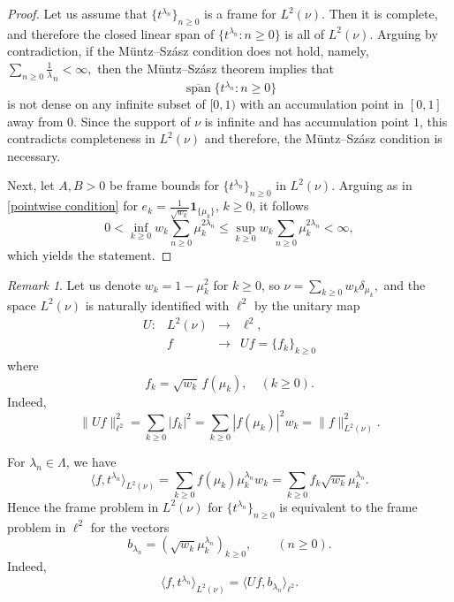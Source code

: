 \documentclass[11pt]{amsart}
\theoremstyle{definition}
\theoremstyle{remark}
\newtheorem{remark}{Remark}
\numberwithin{equation}{section}
\begin{document}
\begin{proof}
Let us assume that $\{t^{\lambda_n}\}_{n\geq 0}$ is a frame for $L^2(\nu)$. Then it is complete, and therefore the closed linear span of
$\{t^{\lambda_n}:n\geq 0\}$ is all of $L^2(\nu)$. Arguing by contradiction, if the Müntz--Szász condition does not hold, namely,
$\sum_{n\geq 0}\frac1\lambda_n<\infty,$ then the Müntz--Szász theorem implies that
$$
\overline{\operatorname{span}}\{t^{\lambda_n}:n\geq 0\}
$$
is not dense on any infinite subset of $[0,1)$ with an accumulation point in $[0,1]$ away from $0$. Since the support of $\nu$ is infinite and has accumulation point $1$, this contradicts completeness in $L^2(\nu)$ and therefore, the Müntz--Szász condition is necessary.


Next, let \(A,B>0\) be frame bounds for \(\{t^{\lambda_n}\}_{n\ge0}\) in $L^2(\nu)$. Arguing as in \eqref{pointwise condition} for
$e_k=\frac1{\sqrt{w_k}}\mathbf 1_{\{\mu_k\}}$, $k\geq 0$, it follows
\[
0<
\inf_{k\ge0}
w_k\sum_{n\ge0}\mu_k^{2\lambda_n}
\le
\sup_{k\ge0}
w_k\sum_{n\ge0}\mu_k^{2\lambda_n}
<\infty,
\]
which yields the statement.
\end{proof}



\begin{remark}
Let us denote \(w_k=1-\mu_k^2\) for \(k\ge0\), so
$\nu=\sum_{k\ge0}w_k\delta_{\mu_k},
$
and the space \(L^2(\nu)\) is naturally identified with \(\ell^2\) by the unitary map
$$\begin{array}{lccc}\label{def U}
U:&L^2(\nu)&\to&\ell^2,\\
& f& \to &  Uf=\{f_k\}_{k\ge0}
\end{array}
$$
where
\begin{equation}\label{def U}
f_k=\sqrt{w_k}\,f(\mu_k), \quad (k\ge0).
\end{equation}
Indeed,
\[
\|Uf\|_{\ell^2}^2
=
\sum_{k\ge0}|f_k|^2
=
\sum_{k\ge0}|f(\mu_k)|^2w_k
=
\|f\|_{L^2(\nu)}^2.
\]

\noindent For \(\lambda_n\in\Lambda\), we have
\[
\langle f,t^{\lambda_n}\rangle_{L^2(\nu)}
=
\sum_{k\ge0}f(\mu_k)\mu_k^{\lambda_n}w_k
=
\sum_{k\ge0}f_k \sqrt{w_k} \mu_k^{\lambda_n}.
\]
Hence the frame problem in \(L^2(\nu)\) for \(\{t^{\lambda_n}\}_{n\ge0}\) is equivalent to the frame problem in \(\ell^2\) for the vectors
\begin{equation}\label{frame problem}
b_{\lambda_n}
=
\left(\sqrt{w_k}\mu_k^{\lambda_n}\right)_{k\ge0}, \qquad  (n\geq 0).
\end{equation}
Indeed,
\begin{equation}\label{frame problem--}
\langle f,t^{\lambda_n}\rangle_{L^2(\nu)}
=
\langle Uf,b_{\lambda_n}\rangle_{\ell^2}.
\end{equation}
\end{remark}
\end{document}
